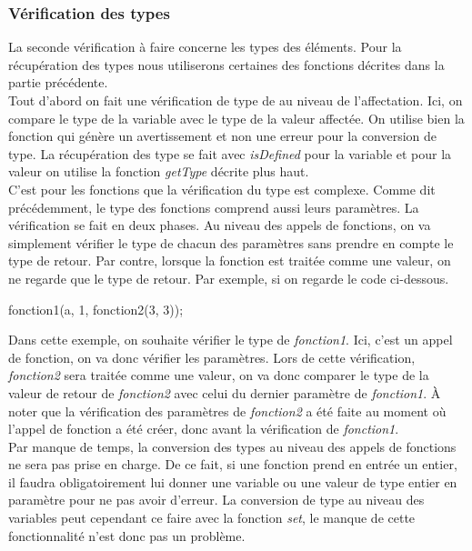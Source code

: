 \documentclass[a4paper]{article}%
\begin{document}
\subsubsection*{Vérification des types} %

La seconde vérification à faire concerne les types des éléments. Pour la
récupération des types nous utiliserons certaines des fonctions décrites dans la
partie précédente.\\

Tout d'abord on fait une vérification de type de au niveau de l'affectation.
Ici, on compare le type de la variable avec le type de la valeur affectée. On
utilise bien la fonction qui génère un avertissement et non une erreur pour la
conversion de type. La récupération des type se fait avec \textit{isDefined}
pour la variable et pour la valeur on utilise la fonction \textit{getType}
décrite plus haut.\\

C'est pour les fonctions que la vérification du type est complexe. Comme dit
précédemment, le type des fonctions comprend aussi leurs paramètres. La
vérification se fait en deux phases. Au niveau des appels de fonctions, on va
simplement vérifier le type de chacun des paramètres sans prendre en compte le
type de retour. Par contre, lorsque la fonction est traitée comme une valeur, on
ne regarde que le type de retour. Par exemple, si on regarde le code ci-dessous.

\begin{grammar}[language=C++]
  fonction1(a, 1, fonction2(3, 3));
\end{grammar}\leavevmode\newline

Dans cette exemple, on souhaite vérifier le type de \textit{fonction1}. Ici,
c'est un appel de fonction, on va donc vérifier les paramètres. Lors de cette
vérification, \textit{fonction2} sera traitée comme une valeur, on va donc
comparer le type de la valeur de retour de \textit{fonction2} avec celui du
dernier paramètre de \textit{fonction1}. À noter que la vérification des
paramètres de \textit{fonction2} a été faite au moment où l'appel de fonction a
été créer, donc avant la vérification de \textit{fonction1}.\\

Par manque de temps, la conversion des types au niveau des appels de fonctions
ne sera pas prise en charge. De ce fait, si une fonction prend en entrée un
entier, il faudra obligatoirement lui donner une variable ou une valeur de type
entier en paramètre pour ne pas avoir d'erreur. La conversion de type au niveau
des variables peut cependant ce faire avec la fonction \textit{set}, le manque
de cette fonctionnalité n'est donc pas un problème.\\
\end{document}
